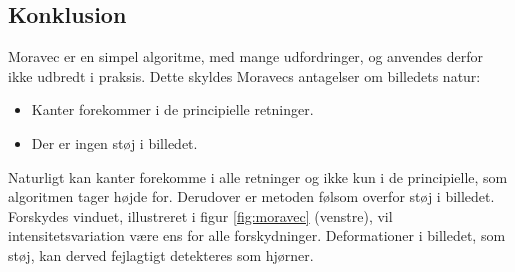 \subsection*{Konklusion}
Moravec er en simpel algoritme, med mange udfordringer, og anvendes derfor ikke udbredt i praksis. Dette skyldes Moravecs antagelser om billedets natur:
\begin{itemize}
\item{Kanter forekommer i de principielle retninger.}
\item{Der er ingen støj i billedet.}
\end{itemize} 
Naturligt kan kanter forekomme i alle retninger og ikke kun i de principielle, som algoritmen tager højde for. Derudover er metoden følsom overfor støj i billedet. Forskydes vinduet, illustreret i figur \ref{fig:moravec} (venstre), vil intensitetsvariation være ens for alle forskydninger. Deformationer i billedet, som støj, kan derved fejlagtigt detekteres som hjørner.
